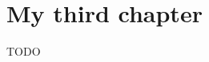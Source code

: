 \chapter{My third chapter}\label{cha:3}

\ifpdf
\graphicspath{{Chapter3/Figs/Raster/}{Chapter3/Figs/PDF/}{Chapter3/Figs/}}
\else
\graphicspath{{Chapter3/Figs/Vector/}{Chapter3/Figs/}}
\fi

TODO